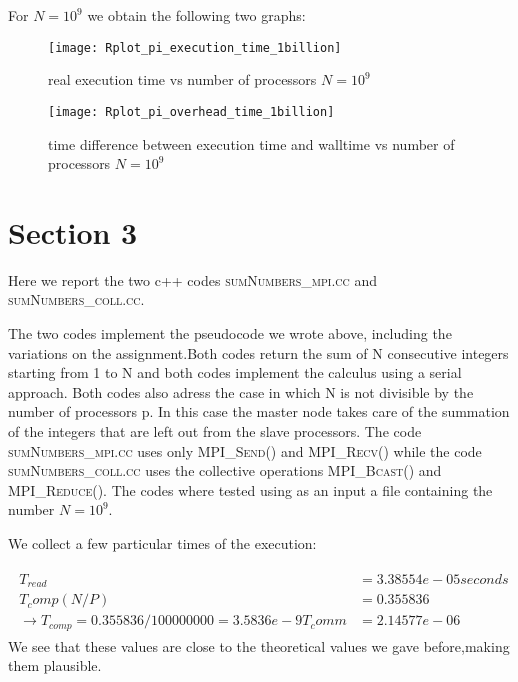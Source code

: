 \documentclass[11pt]{scrartcl} %
\begin{document}
For $N = 10^9$ we obtain the following two graphs:
\begin{figure}[H] %
	\centering
	\texttt{[image: Rplot\_pi\_execution\_time\_1billion]} %
	\caption{real execution time vs number of processors $N= 10^9$}
\end{figure}
\begin{figure}[H] %
	\centering
	\texttt{[image: Rplot\_pi\_overhead\_time\_1billion]} %
	\caption{time difference between execution time and walltime vs number of processors $N= 10^9$}
\end{figure}
\section{Section 3}
Here we report the two c++ codes \textsc{sumNumbers\_mpi.cc} and \textsc{sumNumbers\_coll.cc}.

The two codes implement the pseudocode we wrote above, including the variations on the assignment.Both codes return the sum of N consecutive integers starting from 1 to N and both codes implement the calculus using a serial approach. Both codes also adress the case in which N is not divisible by the number of processors p. In this case the master node takes care of the summation of the integers that are left out from the slave processors.
The code \textsc{sumNumbers\_mpi.cc} uses only \textsc{MPI\_Send()} and \textsc{MPI\_Recv()}
while the code \textsc{sumNumbers\_coll.cc} uses the collective operations \textsc{MPI\_Bcast()} and \textsc{MPI\_Reduce()}. The codes where tested using as an input a file containing the number $N = 10^9$.

We collect a few particular times of the execution:

\begin{align} 
	\begin{split}
		T_{read}&= 3.38554 e-05 seconds\\
		T_comp (N/P)&= 0.355836\\
		\rightarrow T_{comp} = 0.355836/100000000 = 3.5836e-9
		T_comm&=2.14577e-06
	\end{split}					
\end{align}
 We see that these values are close to the theoretical values we gave before,making them plausible.
\end{document}
